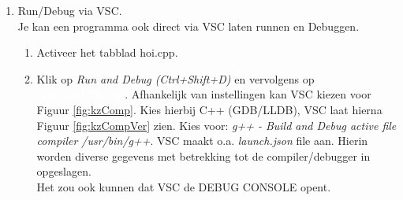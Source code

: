 \begin{enumerate}
     \item Run/Debug via VSC.\\
     Je kan een programma ook direct via VSC laten runnen en Debuggen.
     \begin{enumerate}
     	\item Activeer het tabblad hoi.cpp.
     	\item Klik op \textit{Run and Debug (Ctrl+Shift+D)}  en vervolgens op\\ \colorbox{NavyBlue}{\textcolor{White}{\textbf{Run and Debug}}}. Afhankelijk van instellingen kan VSC kiezen voor Figuur \ref{fig:kzComp}. 
   Kies hierbij C++ (GDB/LLDB), VSC laat hierna Figuur \ref{fig:kzCompVer} zien. Kies voor: \textit{g++ - Build and Debug active file \small{compiler /usr/bin/g++}}.
   VSC maakt o.a. \textit{launch.json} file aan. Hierin worden diverse gegevens met betrekking tot de compiler/debugger in opgeslagen. \\
   Het zou ook kunnen dat VSC de DEBUG CONSOLE opent. 
      

\end{enumerate}
\end{enumerate}
